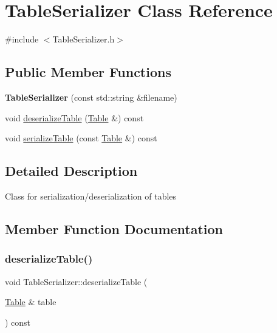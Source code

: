 \hypertarget{classTableSerializer}{}\section{Table\+Serializer Class Reference}
\label{classTableSerializer}


{\ttfamily \#include $<$Table\+Serializer.\+h$>$}

\subsection*{Public Member Functions}
\begin{DoxyCompactItemize}
\item 
\mbox{\label{classTableSerializer_a1f3a527b8e29797132cc620f6f76f561}} 
{\bfseries Table\+Serializer} (const std\+::string \&filename)
\item 
void \hyperlink{classTableSerializer_a32f949dbbdb89cc075a95f33046b8862}{deserialize\+Table} (\hyperlink{classTable}{Table} \&) const
\item 
void \hyperlink{classTableSerializer_ac27835ff2840e21cf2bc3c7e78ce87a4}{serialize\+Table} (const \hyperlink{classTable}{Table} \&) const
\end{DoxyCompactItemize}


\subsection{Detailed Description}
Class for serialization/deserialization of tables 

\subsection{Member Function Documentation}
\mbox{\label{classTableSerializer_a32f949dbbdb89cc075a95f33046b8862}} 
\subsubsection{\texorpdfstring{deserialize\+Table()}{deserializeTable()}}
{\footnotesize\ttfamily void Table\+Serializer\+::deserialize\+Table (\begin{DoxyParamCaption}\item[{\hyperlink{classTable}{Table} \&}]{table }\end{DoxyParamCaption}) const}

